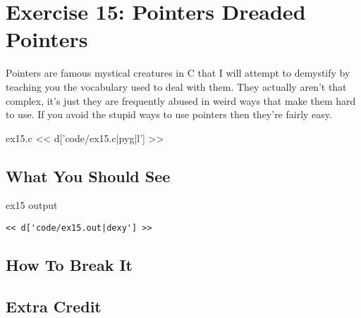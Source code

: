 \chapter{Exercise 15: Pointers Dreaded Pointers}

Pointers are famous mystical creatures in C that I will attempt to
demystify by teaching you the vocabulary used to deal with them.  They
actually aren't that complex, it's just they are frequently abused
in weird ways that make them hard to use.  If you avoid the stupid
ways to use pointers then they're fairly easy.

\begin{code}{ex15.c}
<< d['code/ex15.c|pyg|l'] >>
\end{code}

\section{What You Should See}

\begin{code}{ex15 output}
\begin{lstlisting}
<< d['code/ex15.out|dexy'] >>
\end{lstlisting}
\end{code}

\section{How To Break It}


\section{Extra Credit}



